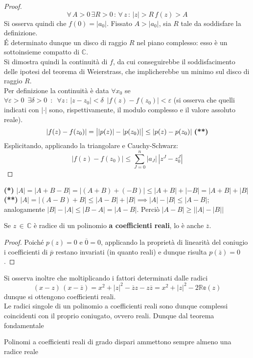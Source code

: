 \documentclass[10pt]{article}
\theoremstyle{plain}
\begin{document}
\begin{proof}
\[\forall \, A > 0 \, \exists R > 0 \, : \, \forall \, z \, : \, |z| > R \, f(z) > A\]
Si osserva quindi che $f(0) = |a_0|$. Fissato $A > |a_0|$, sia $R$ tale da soddisfare la definizione. 
\\\'E determinato dunque un disco di raggio $R$ nel piano complesso: esso è un sottoinsieme compatto di $\mathbb{C}$.
\\Si dimostra quindi la continuità di $f$, da cui conseguirebbe il soddisfacimento delle ipotesi del teorema di Weierstrass, che implicherebbe un minimo sul disco di raggio $R$.
\\Per definizione la continuità è data $\forall x_0$ se $\forall \varepsilon > 0 \enspace \exists \delta > 0 \enspace : \enspace \forall z \, : \, |z - z_0| < \delta  \enspace |f(z) - f(z_0)| < \varepsilon$ (si osserva che quelli indicati con $|\cdot |$ sono, rispettivamente, il modulo complesso e il valore assoluto reale).
\[|f(z) - f(z_0)| = \big||p(z)| - |p(z_0)|\big| \leq |p(z) - p(z_0)| \textrm{ \textbf{(**)}}\]
Esplicitando, applicando la triangolare e Cauchy-Schwarz:
\[|f(z) - f(z_0)| \leq \sum\limits_{J=0}^n |a_J| \, |z^J - z_0^J|\]
\end{proof}
\textbf{(*)} $|A| = |A + B - B| = |(A+B) + (-B)| \leq |A+B| + |-B| = |A+B| + |B|$
\\\textbf{(**)} $|A| = |(A-B) + B| \leq |A-B| + |B| \implies |A| - |B| \leq |A-B|$; analogamente $|B| - |A| \leq |B-A| = |A-B|$. Perciò $|A-B| \geq \big| |A| - |B| \big|$


\begin{cor}
Se $z \, \in \, \mathbb{C}$ è radice di un polinomio \textbf{a coefficienti reali}, lo è anche $\overline{z}$.
\end{cor}
\begin{proof}
Poiché $p(z) = 0$ e $\overline{0} = 0$, applicando la proprietà di linearità del coniugio i coefficienti di $\overline{p}$ restano invariati (in quanto reali) e dunque risulta $p(\overline{z}) = 0$.
\end{proof}
Si osserva inoltre che moltiplicando i fattori determinati dalle radici
\[(x - z)\, (x - \overline{z}) = x^2 + |z|^2 - \overline{z}z - z \overline{z} = x^2 + |z|^2 - 2 \mathbb{Re}(z)\]
dunque si ottengono coefficienti reali.
\\Le radici singole di un polinomio a coefficienti reali sono dunque complessi coincidenti con il proprio coniugato, ovvero reali. Dunque dal teorema fondamentale
\begin{oss}
Polinomi a coefficienti reali di grado dispari ammettono sempre almeno una radice reale
\end{oss}
\end{document}
